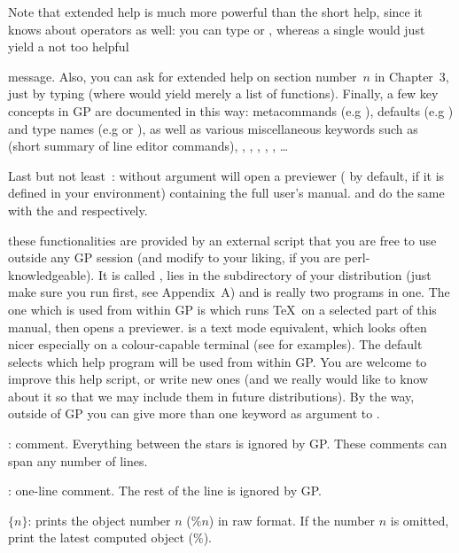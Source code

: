 Note that extended help is much more powerful than the short help, since
it knows about operators as well: you can type  or
, whereas a single  would just yield a not too helpful


\noindent message. Also, you can ask for extended help on section
number~$n$ in Chapter~3, just by typing  (where  would
yield merely a list of functions). Finally, a few key concepts in GP are
documented in this way: metacommands (e.g ), defaults (e.g
) and type names (e.g  or ), as well as
various miscellaneous keywords such as  (short summary of line
editor commands), , , ,
, , \dots

Last but not least~:  without argument will open a 
previewer ( by default,  if it is defined in your
environment) containing the full user's manual.  and
 do the same with the  and 
respectively.

 these functionalities are provided by an
external  script that you are free to use outside any GP session
(and modify to your liking, if you are perl-knowledgeable). It is called
, lies in the  subdirectory of your distribution
(just make sure you run  first, see Appendix~A) and is
really two programs in one. The one which is used from within GP is
 which runs \TeX\ on a selected part of this manual, then opens
a previewer.  is a text mode equivalent, which looks
often nicer especially on a colour-capable terminal (see
 for examples). The default  selects which
help program will be used from within GP. You are welcome to improve this
help script, or write new ones (and we really would like to know about it
so that we may include them in future distributions). By the way, outside
of GP you can give more than one keyword as argument to .

: comment. Everything between the stars is ignored by
GP. These comments can span any number of lines.

\subseckbd{\bs\bs}: one-line comment. The rest of the line
is ignored by GP.

 $\{n\}$: prints the object number $n$ ($\%n$)
in raw format. If the number $n$ is omitted, print the latest computed object
($\%$). \label{se:history}

